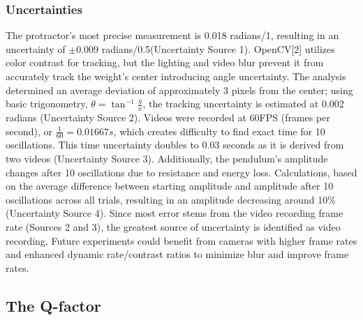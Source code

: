 \documentclass[11pt,titlepage,a4paper,twocolumn]{article}
\begin{document}
{        \subsubsection{Uncertainties}
        \hspace{\parindent}\hspace{\parindent}The protractor's most precise measurement is 0.018 radians/1\degree, resulting in an uncertainty of $\pm 0.009$ radians/0.5\degree (Uncertainty Source 1). OpenCV[2] utilizes color contrast for tracking, but the lighting and video blur prevent it from accurately track the weight's center introducing angle uncertainty. The analysis determined an average deviation of approximately 3 pixels from the center; using basic trigonometry, $\theta = \tan^{-1}\frac{y}{x}$, the tracking uncertainty is estimated at 0.002 radians (Uncertainty Source 2). Videos were recorded at 60FPS (frames per second), or $\frac{1}{60} = 0.01667s$, which creates difficulty to find exact time for 10 oscillations. This time uncertainty doubles to 0.03 seconds as it is derived from two videos (Uncertainty Source 3). Additionally, the pendulum's amplitude changes after 10 oscillations due to resistance and energy loss. Calculations, based on the average difference between starting amplitude and amplitude after 10 oscillations across all trials, resulting in an amplitude decreasing around 10\% (Uncertainty Source 4). Since most error stems from the video recording frame rate (Sources 2 and 3), the greatest source of uncertainty is identified as video recording. Future experiments could benefit from cameras with higher frame rates and enhanced dynamic rate/contrast ratios to minimize blur and improve frame rates.
    \subsection{The Q-factor}
}
\end{document}
